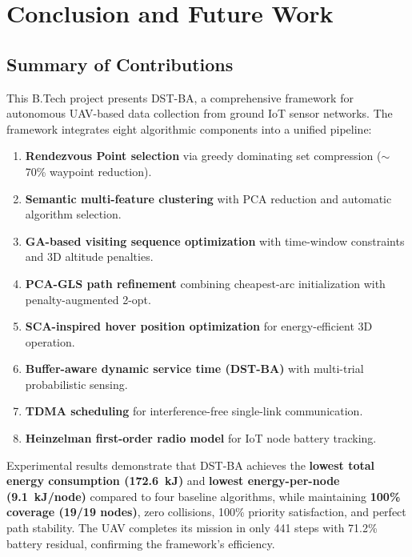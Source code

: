 \documentclass[12pt, a4paper, oneside]{report}
\begin{document}
\chapter{Conclusion and Future Work}
\label{ch:conclusion}

\section{Summary of Contributions}

This B.Tech project presents DST-BA, a comprehensive framework for autonomous UAV-based data collection from ground IoT sensor networks. The framework integrates eight algorithmic components into a unified pipeline:

\begin{enumerate}
    \item \textbf{Rendezvous Point selection} via greedy dominating set compression ($\sim$70\% waypoint reduction).
    \item \textbf{Semantic multi-feature clustering} with PCA reduction and automatic algorithm selection.
    \item \textbf{GA-based visiting sequence optimization} with time-window constraints and 3D altitude penalties.
    \item \textbf{PCA-GLS path refinement} combining cheapest-arc initialization with penalty-augmented 2-opt.
    \item \textbf{SCA-inspired hover position optimization} for energy-efficient 3D operation.
    \item \textbf{Buffer-aware dynamic service time (DST-BA)} with multi-trial probabilistic sensing.
    \item \textbf{TDMA scheduling} for interference-free single-link communication.
    \item \textbf{Heinzelman first-order radio model} for IoT node battery tracking.
\end{enumerate}

Experimental results demonstrate that DST-BA achieves the \textbf{lowest total energy consumption (172.6~kJ)} and \textbf{lowest energy-per-node (9.1~kJ/node)} compared to four baseline algorithms, while maintaining \textbf{100\% coverage (19/19 nodes)}, zero collisions, 100\% priority satisfaction, and perfect path stability. The UAV completes its mission in only 441 steps with 71.2\% battery residual, confirming the framework's efficiency.
\end{document}
